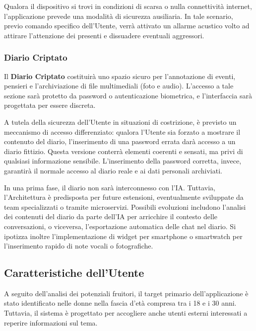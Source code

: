 \documentclass[a4paper,12pt]{article}
\newcommand{\ignoreglossary}{}
\begin{document}
Qualora il dispositivo si trovi in condizioni di scarsa o nulla connettività internet, l'applicazione prevede una modalità di sicurezza ausiliaria. In tale scenario, previo comando specifico dell'Utente, verrà attivato un allarme acustico volto ad attirare l'attenzione dei presenti e dissuadere eventuali aggressori.

\subsubsection{Diario Criptato}
Il \textbf{Diario Criptato} costituirà uno spazio sicuro per l'annotazione di eventi, pensieri e l'archiviazione di file multimediali (foto e audio). L'accesso a tale sezione sarà protetto da password o autenticazione biometrica, e l'interfaccia sarà progettata per essere discreta.

A tutela della sicurezza dell'Utente in situazioni di costrizione, è previsto un meccanismo di accesso differenziato: qualora l'Utente sia forzato a mostrare il contenuto del diario, l'inserimento di una password errata darà accesso a un diario fittizio. Questa versione conterrà elementi coerenti e sensati, ma privi di qualsiasi informazione sensibile. L'inserimento della password corretta, invece, garantirà il normale accesso al diario reale e ai dati personali archiviati.

In una prima fase, il diario non sarà interconnesso con l'IA.
Tuttavia, l'Architettura è predisposta per future estensioni, eventualmente sviluppate da team specializzati o tramite microservizi. Possibili evoluzioni includono l'analisi dei contenuti del diario da parte dell'IA per arricchire il contesto delle conversazioni, o viceversa, l'esportazione automatica delle chat nel diario. Si ipotizza inoltre l'implementazione di widget per smartphone o smartwatch per l'inserimento rapido di note vocali o fotografiche.


\subsection{Caratteristiche dell'\ignoreglossary{Utente}} \label{sec:caratteristiche utente}
A seguito dell'analisi dei potenziali fruitori, il target primario dell'applicazione è stato identificato nelle donne nella fascia d'età compresa tra i 18 e i 30 anni. Tuttavia, il sistema è progettato per accogliere anche utenti esterni interessati a reperire informazioni sul tema.
\end{document}
